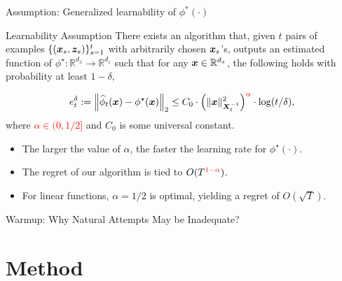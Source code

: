 \documentclass[10pt, xcolor={dvipsnames,x11names},compress]{beamer}
\begin{document}
\begin{frame}{Assumption: Generalized learnability of $\phi^*(\cdot)$}

\begin{alertblock}{Learnability Assumption}
There exists an algorithm that, given $t$ pairs of examples $\{({\bm{x}}_s, {\bm{z}}_s)\}_{s=1}^t$ with  arbitrarily chosen ${\bm{x}}_s$'s,   outputs an estimated function of $\phi^\star: \mathbb{R}^{d_x} \rightarrow \mathbb{R}^{d_z}$ such that for any ${\bm{x}}\in \mathbb{R}^{d_x}$,  the following holds with probability at least $1-\delta$, 

\begin{align}
     e_t^\delta:=\left\|\widehat{\phi}_t(\boldsymbol{x})-\phi^{\star}(\boldsymbol{x})\right\|_2 \leq C_0 \cdot\left(\|\boldsymbol{x}\|_{\boldsymbol{X}_t^{-1}}^2\right)^{\textcolor{red}{\alpha}} \cdot \log (t / \delta), \nonumber
\end{align}
where \textcolor{red}{$\alpha \in (0, 1/2]$} and $C_0$ is some universal constant. 
\end{alertblock}

\vspace{+10pt}

\begin{itemize}
    \item The larger the value of $\alpha$, the faster the learning rate for $\phi^{\star}(\cdot)$.
    \item The regret of our algorithm is tied to $O(T^{\textcolor{red}{1-\alpha}})$.
    \item For linear functions, $\alpha = 1/2$ is optimal, yielding a regret of $O(\sqrt{T})$.
\end{itemize}

\end{frame}

\begin{frame}[label=warmup]{Warmup: Why Natural Attempts May be Inadequate?}



\end{frame}

\section{Method}
\end{document}
